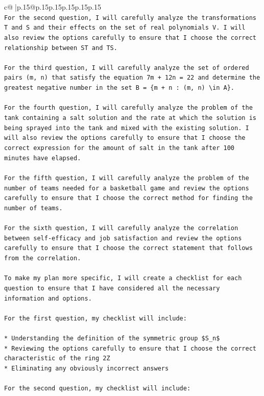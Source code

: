 \documentclass{article}
\begin{document}
{\begin{supertabular}{c@{$\;$}|p{.15\linewidth}@{}p{.15\linewidth}p{.15\linewidth}p{.15\linewidth}p{.15\linewidth}p{.15\linewidth}}
{{{\\ 
\texttt{For the second question, I will carefully analyze the transformations T and S and their effects on the set of real polynomials V. I will also review the options carefully to ensure that I choose the correct relationship between ST and TS.} \\
\\ 
\texttt{For the third question, I will carefully analyze the set of ordered pairs (m, n) that satisfy the equation 7m + 12n = 22 and determine the greatest negative number in the set B = \{m + n : (m, n) \textbackslash{}in A\}.} \\
\\ 
\texttt{For the fourth question, I will carefully analyze the problem of the tank containing a salt solution and the rate at which the solution is being sprayed into the tank and mixed with the existing solution. I will also review the options carefully to ensure that I choose the correct expression for the amount of salt in the tank after 100 minutes have elapsed.} \\
\\ 
\texttt{For the fifth question, I will carefully analyze the problem of the number of teams needed for a basketball game and review the options carefully to ensure that I choose the correct method for finding the number of teams.} \\
\\ 
\texttt{For the sixth question, I will carefully analyze the correlation between self{-}efficacy and job satisfaction and review the options carefully to ensure that I choose the correct statement that follows from the correlation.} \\
\\ 
\texttt{To make my plan more specific, I will create a checklist for each question to ensure that I have considered all the necessary information and options.} \\
\\ 
\texttt{For the first question, my checklist will include:} \\
\\ 
\texttt{* Understanding the definition of the symmetric group \$S\_n\$} \\
\texttt{* Reviewing the options carefully to ensure that I choose the correct characteristic of the ring 2Z} \\
\texttt{* Eliminating any obviously incorrect answers} \\
\\ 
\texttt{For the second question, my checklist will include:} \\
}}}
\end{supertabular}}
\end{document}
